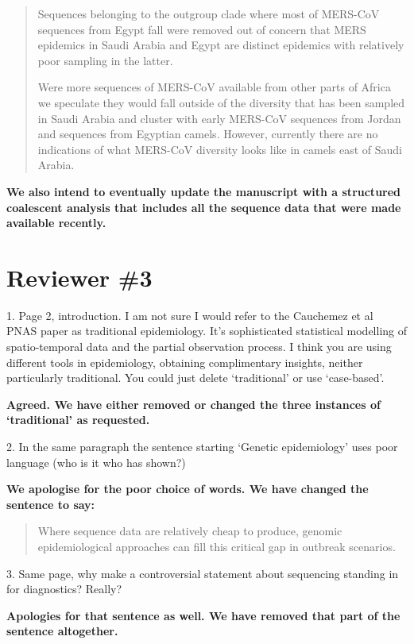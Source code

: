 \documentclass[11pt,oneside,letterpaper]{article}
\begin{document}
\begin{quotation}
Sequences belonging to the outgroup clade where most of MERS-CoV sequences from Egypt fall were removed out of concern that MERS epidemics in Saudi Arabia and Egypt are distinct epidemics with relatively poor sampling in the latter.

Were more sequences of MERS-CoV available from other parts of Africa we speculate they would fall outside of the diversity that has been sampled in Saudi Arabia and cluster with early MERS-CoV sequences from Jordan and sequences from Egyptian camels.
However, currently there are no indications of what MERS-CoV diversity looks like in camels east of Saudi Arabia.
\end{quotation}

\textbf{We also intend to eventually update the manuscript with a structured coalescent analysis that includes all the sequence data that were made available recently.}

\section*{Reviewer \#3}

1. Page 2, introduction. I am not sure I would refer to the Cauchemez et al PNAS paper as traditional epidemiology. It's sophisticated statistical modelling of spatio-temporal data and the partial observation process. I think you are using different tools in epidemiology, obtaining complimentary insights, neither particularly traditional. You could just delete `traditional' or use `case-based'.

\textbf{Agreed. We have either removed or changed the three instances of `traditional' as requested.}

2. In the same paragraph the sentence starting `Genetic epidemiology' uses poor language (who is it who has shown?)

\textbf{We apologise for the poor choice of words. We have changed the sentence to say:}

\begin{quotation}
Where sequence data are relatively cheap to produce, genomic epidemiological approaches can fill this critical gap in outbreak scenarios.
\end{quotation}

3. Same page, why make a controversial statement about sequencing standing in for diagnostics? Really?

\textbf{Apologies for that sentence as well. We have removed that part of the sentence altogether.}
\end{document}
